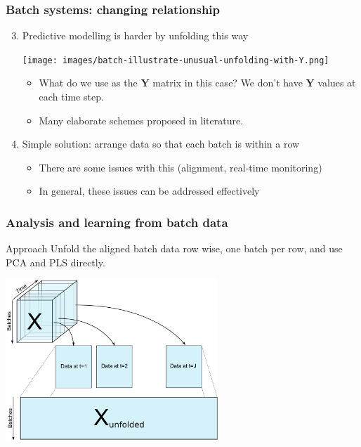 \begin{frame}\frametitle{Batch systems: changing relationship}
\begin{enumerate}
	\setcounter{enumi}{2}
	\item 	Predictive modelling is harder by unfolding this way

			\begin{center}
				\texttt{[image: images/batch-illustrate-unusual-unfolding-with-Y.png]}
			\end{center}
			
		
			\begin{itemize}
				\item 	What do we use as the \( \mathbf{Y} \) matrix in this case? {\scriptsize We don't have  \( \mathbf{Y} \) values at each time step.}
				\item 	Many elaborate schemes proposed in literature.			
			\end{itemize}
		
	\item 	Simple solution: arrange data so that each batch is within a row
	
			\begin{itemize}
				\item 	There are some issues with this  (alignment, real-time monitoring)
				\item 	In general, these issues can be addressed effectively
			\end{itemize}
\end{enumerate}
\end{frame}

\begin{frame}\frametitle{Analysis and learning from batch data}

	\begin{exampleblock}{Approach}
	Unfold the aligned batch data row wise, one batch per row, and use PCA and PLS directly.
	\end{exampleblock}

	\begin{center}
		\includegraphics[width=8cm]{images/batch-data-unfolding-X-only.png}	
	\end{center}
\end{frame}	

